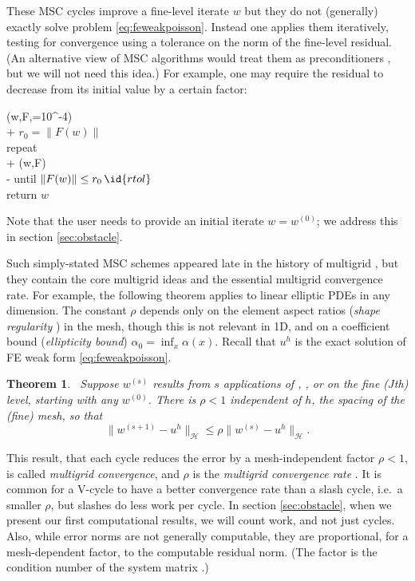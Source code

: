 \documentclass[letterpaper,final,12pt,reqno]{amsart}
\theoremstyle{claim}
\newtheorem{theorem}{Theorem}
\numberwithin{equation}{section}
\numberwithin{figure}{section}
\numberwithin{table}{section}
\numberwithin{theorem}{section}
\begin{document}
These MSC cycles improve a fine-level iterate $w$ but they do not (generally) exactly solve problem \eqref{eq:feweakpoisson}.  Instead one applies them iteratively, testing for convergence using a tolerance on the norm of the fine-level residual.  (An alternative view of MSC algorithms would treat them as preconditioners \cite[for example]{Bueler2021}, but we will not need this idea.)  For example, one may require the residual to decrease from its initial value by a certain factor:
\begin{pseudo*} \label{ps:msc-solver}
(w,F,=10^{-4})\text{:} \\+
    $r_0 = \|F(w)\|$ \\
    repeat \\+
        (w,F) \qquad\qquad {} \\-
    until $\|F(w)\| \le r_0\, \id{rtol}$ \\
    return $w$
\end{pseudo*}
Note that the user needs to provide an initial iterate $w=w^{(0)}$; we address this in section \ref{sec:obstacle}.

Such simply-stated MSC schemes appeared late in the history of multigrid \cite{Xu1992}, but they contain the core multigrid ideas and the essential multigrid convergence rate.  For example, the following theorem applies to linear elliptic PDEs in any dimension.  The constant $\rho$ depends only on the element aspect ratios (\emph{shape regularity} \cite{Elmanetal2014}) in the mesh, though this is not relevant in 1D, and on a coefficient bound (\emph{ellipticity bound}) $\alpha_0=\inf_x \alpha(x)$.  Recall that $u^h$ is the exact solution of FE weak form \eqref{eq:feweakpoisson}.

\begin{theorem} \cite[Thm.~3.10]{GraeserKornhuber2009}\,  \label{thm:mscconvergence}  Suppose $w^{(s)}$  results from $s$ applications of , , or  on the fine ($J$th) level, starting with any $w^{(0)}$.  There is $\rho<1$ independent of $h$, the spacing of the (fine) mesh, so that
\begin{equation}
  \|w^{(s+1)} - u^h\|_{\mathcal{H}} \le \rho \|w^{(s)} - u^h\|_{\mathcal{H}}.  \label{eq:mscconvergence}
\end{equation}
\end{theorem}

This result, that each cycle reduces the error by a mesh-independent factor $\rho<1$, is called \emph{multigrid convergence}, and $\rho$ is the \emph{multigrid convergence rate} \cite{Braess2007}.  It is common for a V-cycle to have a better convergence rate than a slash cycle, i.e.~a smaller $\rho$, but slashes do less work per cycle.  In section \ref{sec:obstacle}, when we present our first computational results, we will count work, and not just cycles.  Also, while error norms are not generally computable, they are proportional, for a mesh-dependent factor, to the computable residual norm.  (The factor is the condition number of the system matrix \cite[Chapter 2]{Bueler2016}.)
\end{document}
